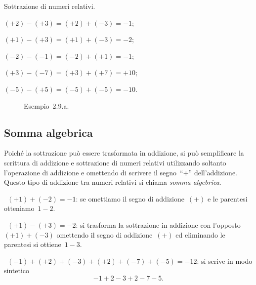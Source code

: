 \begin{exrig}
 \begin{esempio}
 Sottrazione di numeri relativi.
 \begin{enumeratea}
 \item $(+2)-(+3)=(+2)+(-3)=-1$;
\item $(+1)-(+3)=(+1)+(-3)=-2$;
\item $(-2)-(-1)=(-2)+(+1)=-1$;
\item $(+3)-(-7)=(+3)+(+7)=+10$;
\item $(-5)-(+5)=(-5)+(-5)=-10$.
 \end{enumeratea}
 \end{esempio}
\end{exrig}

\begin{figure}[t]
 \centering
 \caption{Esempio~2.9.a.}
\end{figure}

\ovalbox{\risolvii \ref{ese:2.9}, \ref{ese:2.10}, \ref{ese:2.11}, \ref{ese:2.12}, \ref{ese:2.13}}

\subsection{Somma algebrica}

Poiché la sottrazione può essere trasformata in addizione, si può semplificare la scrittura di addizione
e sottrazione di numeri relativi utilizzando soltanto l'operazione di addizione e omettendo di scrivere
il segno~``$+$'' dell'addizione. Questo tipo di addizione tra numeri relativi si chiama \emph{somma algebrica}.

\begin{exrig}
 \begin{esempio}
~$(+1)+(-2)=-1$: se omettiamo il segno di addizione~$(+)$ e le parentesi otteniamo~$1-2$.
 \end{esempio}

\begin{esempio}
~$(+1)-(+3)=-2$: si trasforma la sottrazione in addizione con l'opposto~$(+1)+(-3)$ omettendo il segno
di addizione~$(+)$ ed eliminando le parentesi si ottiene~$1-3$.
 \end{esempio}

\begin{esempio}
~$(-1)+(+2)+(-3)+(+2)+(-7)+(-5)=-12$: si scrive in modo sintetico \[-1+2-3+2-7-5.\]
 \end{esempio}

\end{exrig}

